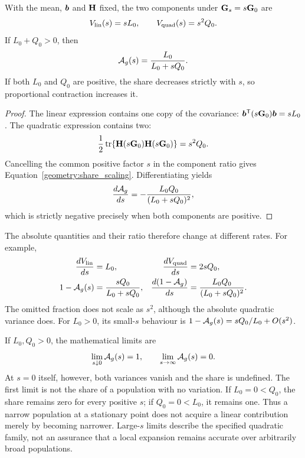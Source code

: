 \begin{proposition}
\label{geometry:scaling_proposition}
With the mean, $\boldsymbol{b}$ and $\mathbf{H}$ fixed, the two components under
$\mathbf{G}_s=s\mathbf{G}_0$ are
\begin{equation}
V_{\mathrm{lin}}(s)=sL_0,
\qquad V_{\mathrm{quad}}(s)=s^2Q_0.
\label{geometry:component_scaling}
\end{equation}
If $L_0+Q_0>0$, then
\begin{equation}
\mathcal A_g(s)=\frac{L_0}{L_0+sQ_0}.
\label{geometry:share_scaling}
\end{equation}
If both $L_0$ and $Q_0$ are positive, the share decreases strictly with
$s$, so proportional contraction increases it.
\end{proposition}
\begin{proof}
The linear expression contains one copy of the covariance:
$\boldsymbol{b}^{\mathsf T}(s\mathbf{G}_0)\boldsymbol{b}=sL_0$.
The quadratic expression contains two:
\[
\frac12\operatorname{tr}\{\mathbf{H}(s\mathbf{G}_0)\mathbf{H}(s\mathbf{G}_0)\}
 =s^2Q_0.
\]
Cancelling the common positive factor $s$ in the component ratio gives
Equation~\eqref{geometry:share_scaling}. Differentiating yields
\begin{equation}
\frac{d\mathcal A_g}{ds}
 =-\frac{L_0Q_0}{(L_0+sQ_0)^2},
\label{geometry:share_derivative}
\end{equation}
which is strictly negative precisely when both components are positive.
\end{proof}

The absolute quantities and their ratio therefore change at different
rates. For example,
\begin{align}
\frac{dV_{\mathrm{lin}}}{ds}&=L_0,
&\frac{dV_{\mathrm{quad}}}{ds}&=2sQ_0,\nonumber\\
1-\mathcal A_g(s)&=\frac{sQ_0}{L_0+sQ_0},
&\frac{d(1-\mathcal A_g)}{ds}&=\frac{L_0Q_0}{(L_0+sQ_0)^2}.
\label{geometry:omitted_fraction}
\end{align}
The omitted fraction does not scale as $s^2$, although the absolute
quadratic variance does. For $L_0>0$, its small-$s$ behaviour is
$1-\mathcal A_g(s)=sQ_0/L_0+O(s^2)$.

If $L_0,Q_0>0$, the mathematical limits are
\[
\lim_{s\downarrow0}\mathcal A_g(s)=1,
\qquad
\lim_{s\to\infty}\mathcal A_g(s)=0.
\]
At $s=0$ itself, however, both variances vanish and the share is undefined.
The first limit is not the share of a population with no variation.
If $L_0=0<Q_0$, the share remains zero for every positive $s$; if
$Q_0=0<L_0$, it remains one. Thus a narrow population at a stationary
point does not acquire a linear contribution merely by becoming narrower.
Large-$s$ limits describe the specified quadratic family, not an assurance
that a local expansion remains accurate over arbitrarily broad populations.

